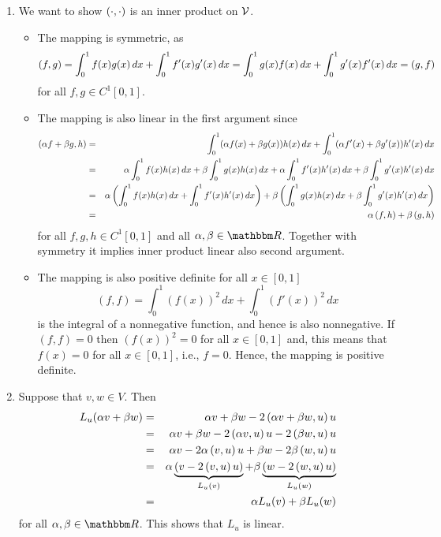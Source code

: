 \begin{solution}
\begin{enumerate}
\item We want to show $\left( \cdot,\cdot \right)$  is an inner product on ${\cal V}$.
\begin{itemize}
\item The mapping is symmetric, as 
\[
\left( f,g \right) = \int_0^1 f(x) g(x) \, dx + \int_0^1 f'(x) g'(x) \, dx = \int_0^1 g(x) f(x) \, dx + \int_0^1 g'(x) f'(x) \, dx = \left( g,f \right)
\]
for all $f,g\in C^1[0,1]$.

\item The mapping is also linear in the first argument since
\begin{eqnarray*}
\left( \alpha f + \beta g, h \right) &=& \int_0^1 (\alpha f(x) + \beta g(x)) h(x) \, d x +  \int_0^1 (\alpha f'(x) + \beta g'(x)) h'(x) \, d x
\\
&=&  \alpha \int_0^1 f(x) h(x) \, dx +  \beta \int_0^1 g (x) h (x) \, dx + \alpha \int_0^1 f'(x) h'(x) \, dx +  \beta \int_0^1 g'(x) h'(x) \, dx\\
&=&  \alpha \left(\int_0^1 f(x) h(x) \, dx + \int_0^1 f'(x) h'(x) \, dx \right) +  \beta \left(\int_0^1 g (x) h (x) \, dx  +  \beta \int_0^1 g'(x) h'(x) \, dx \right)
\\
&=& \alpha \left( f,h \right) + \beta \left( g,h \right)
\end{eqnarray*}
for all $f,g,h\in C^1[0,1]$ and all $\alpha,\beta\in\R$. Together with symmetry it implies inner product linear also second argument.

\item The mapping is also positive definite  for all $x\in[0,1]$ 
\[
(f,f) = \int_0^1 (f(x))^2\, d x + \int_0^1 (f'(x))^2\, d x
\]
is the integral of a nonnegative function, and hence is also nonnegative. If $(f,f) = 0$ then $(f(x))^2 = 0$ for all $x\in[0,1]$ and, this means that $f(x)=0$ for all $x\in[0,1]$, i.e., $f=0$. Hence, the mapping is positive definite.
\end{itemize}
\item Suppose that $v, w \in V$. Then
\begin{eqnarray*}
L_u(\alpha v + \beta w) &=& \alpha v + \beta w-2\left( \alpha v + \beta w,u \right) u\\
											  &=&\alpha v + \beta w - 2\left( \alpha v,u \right) u - 2\left( \beta w,u \right) u\\
											  &=& \alpha v - 2 \alpha \left(  v,u \right) u + \beta w - 2\beta \left(  w,u \right) u\\
											  &=& \alpha \underbrace{\left(v - 2 \left(  v,u \right) u \right)}_{ L_u(v)} + \beta \underbrace{\left( w - 2\left(  w,u \right)
											  u\right)}_{ L_u(w)}\\
											  &=& \alpha  L_u(v) + \beta  L_u(w)
											  \end{eqnarray*}
for all $\alpha, \beta \in \R $. This shows that $L_u$	is linear. 


\end{enumerate}
\end{solution}
